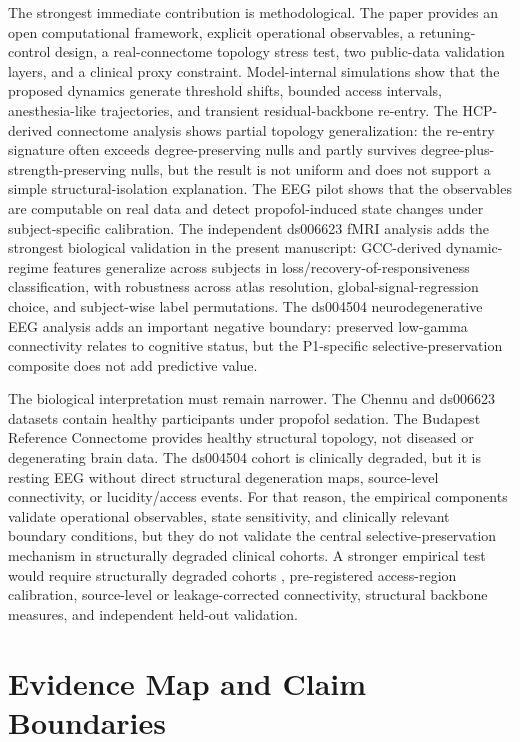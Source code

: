 \documentclass[11pt,a4paper]{article}
\theoremstyle{plain}
\theoremstyle{definition}
\theoremstyle{remark}
\begin{document}
The strongest immediate contribution is methodological. The paper provides an open computational framework, explicit operational observables, a retuning-control design, a real-connectome topology stress test, two public-data validation layers, and a clinical proxy constraint. Model-internal simulations show that the proposed dynamics generate threshold shifts, bounded access intervals, anesthesia-like trajectories, and transient residual-backbone re-entry. The HCP-derived connectome analysis shows partial topology generalization: the re-entry signature often exceeds degree-preserving nulls and partly survives degree-plus-strength-preserving nulls, but the result is not uniform and does not support a simple structural-isolation explanation. The EEG pilot shows that the observables are computable on real data and detect propofol-induced state changes under subject-specific calibration. The independent ds006623 fMRI analysis adds the strongest biological validation in the present manuscript: GCC-derived dynamic-regime features generalize across subjects in loss/recovery-of-responsiveness classification, with robustness across atlas resolution, global-signal-regression choice, and subject-wise label permutations. The ds004504 neurodegenerative EEG analysis adds an important negative boundary: preserved low-gamma connectivity relates to cognitive status, but the P1-specific selective-preservation composite does not add predictive value.

The biological interpretation must remain narrower. The Chennu and ds006623 datasets contain healthy participants under propofol sedation. The Budapest Reference Connectome provides healthy structural topology, not diseased or degenerating brain data. The ds004504 cohort is clinically degraded, but it is resting EEG without direct structural degeneration maps, source-level connectivity, or lucidity/access events. For that reason, the empirical components validate operational observables, state sensitivity, and clinically relevant boundary conditions, but they do not validate the central selective-preservation mechanism in structurally degraded clinical cohorts. A stronger empirical test would require structurally degraded cohorts \citep{laureys2004,giacino2014,naccache2018}, pre-registered access-region calibration, source-level or leakage-corrected connectivity, structural backbone measures, and independent held-out validation.

\section{Evidence Map and Claim Boundaries}
\label{sec:evidence-map}
\end{document}
